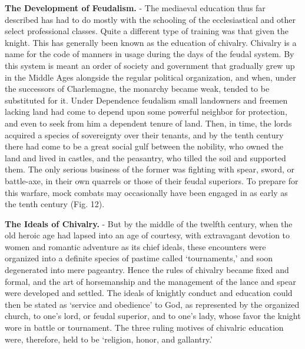 \documentclass[
]{book}
\begin{document}
\textbf{The Development of Feudalism.} - The mediaeval education thus far described has had to do mostly with the schooling of the ecclesiastical and other select professional classes. Quite a different type of training was that given the knight. This has generally been known as the education of chivalry. Chivalry is a name for the code of manners in usage during the days of the feudal system. By this system is meant an order of society and government that gradually grew up in the Middle Ages alongside the regular political organization, and when, under the successors of Charlemagne, the monarchy became weak, tended to be substituted for it. Under Dependence feudalism small landowners and freemen lacking land had come to depend upon some powerful neighbor for protection, and even to seek from him a dependent tenure of land. Then, in time, the lords acquired a species of sovereignty over their tenants, and by the tenth century there had come to be a great social gulf between the nobility, who owned the land and lived in castles, and the peasantry, who tilled the soil and supported them. The only serious business of the former was fighting with spear, sword, or battle-axe, in their own quarrels or those of their feudal superiors. To prepare for this warfare, mock combats may occasionally have been engaged in as early as the tenth century (Fig. 12).

\textbf{The Ideals of Chivalry.} - But by the middle of the twelfth century, when the old heroic age had lapsed into an age of courtesy, with extravagant devotion to women and romantic adventure as its chief ideals, these encounters were organized into a definite species of pastime called `tournaments,' and soon degenerated into mere pageantry. Hence the rules of chivalry became fixed and formal, and the art of horsemanship and the management of the lance and spear were developed and settled. The ideals of knightly conduct and education could then be stated as `service and obedience' to God, as represented by the organized church, to one's lord, or feudal superior, and to one's lady, whose favor the knight wore in battle or tournament. The three ruling motives of chivalric education were, therefore, held to be `religion, honor, and gallantry.'
\end{document}
